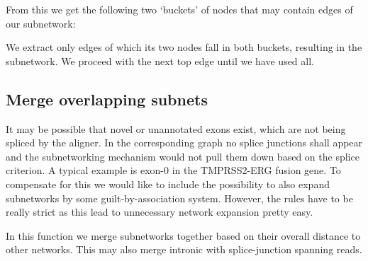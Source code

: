 \documentclass{article}
\theoremstyle{definition}
\begin{document}
From this we get the following two `buckets' of nodes that may contain edges of our subnetwork:


We extract only edges of which its two nodes fall in both buckets, resulting in the subnetwork.
We proceed with the next top edge until we have used all.

\clearpage

\subsection{Merge overlapping subnets}
It may be possible that novel or unannotated exons exist, which are not being spliced by the aligner.
In the corresponding graph no splice junctions shall appear and the subnetworking mechanism would not pull them down based on the splice criterion.
A typical example is exon-0 in the TMPRSS2-ERG fusion gene.
To compensate for this we would like to include the possibility to also expand subnetworks by some guilt-by-association system.
However, the rules have to be really strict as this lead to unnecessary network expansion pretty easy.

In this function we merge subnetworks together based on their overall distance to other networks.
This may also merge intronic with splice-junction spanning reads.
\end{document}
